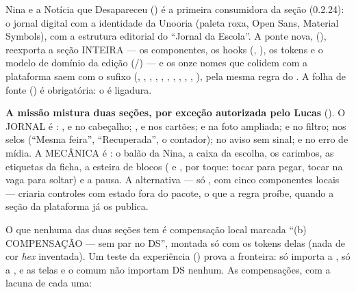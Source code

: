 Nina e a Notícia que Desapareceu () é a primeira consumidora da
seção  (0.2.24): o jornal digital com a identidade da Unooria
(paleta roxa, Open Sans, Material Symbols), com a estrutura editorial do
\enquote{Jornal da Escola}. A ponte nova, 
(), reexporta a seção INTEIRA --- os componentes, os
hooks (, ), os tokens e o modelo
de domínio da edição (/) --- e os onze nomes que colidem
com a plataforma saem com o sufixo  (,
, , , ,
, , , ,
, ), pela mesma regra do . A folha de
fonte () é obrigatória: o  é ligadura.

\begin{decisao}
\textbf{A missão mistura duas seções, por exceção autorizada pelo Lucas}
(). O JORNAL é : ,  e
 no cabeçalho; ,  e
 nos cartões;  e  na foto ampliada;
 e  no filtro;  nos selos (\enquote{Mesma
feira}, \enquote{Recuperada}, o contador);  no aviso sem sinal; e
 no erro de mídia. A MECÂNICA é : o balão da Nina,
a caixa da escolha, os carimbos, as etiquetas da ficha, a esteira de blocos
( e , por toque: tocar para pegar, tocar na
vaga para soltar) e a pausa. A alternativa --- só , com cinco
componentes locais --- criaria controles com estado fora do pacote, o que a
regra proíbe, quando a seção da plataforma já os publica.
\end{decisao}

O que nenhuma das duas seções tem é compensação local marcada
\enquote{(b) COMPENSAÇÃO --- sem par no DS}, montada só com os tokens delas
(nada de cor \emph{hex} inventada). Um teste da experiência
() prova a fronteira:  só importa a
,  só a , e as
telas e o comum não importam DS nenhum. As compensações, com a lacuna de cada
uma:

